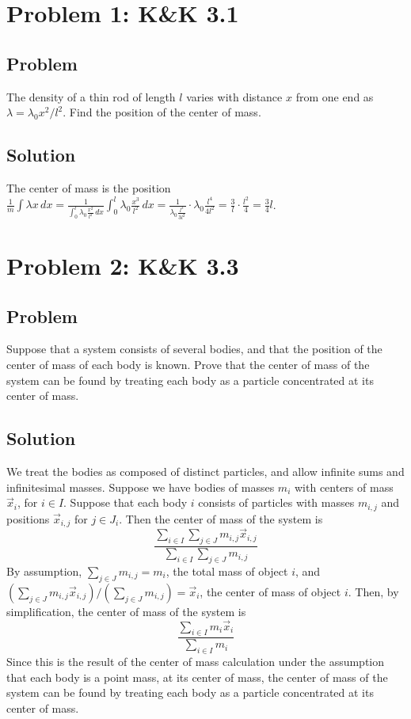 \documentclass[solutions]{esg8012pset}
\date{October 1}
\renewcommand{\d}{\,d}
\begin{document}
\section*{Problem 1: K\&K 3.1}
\subsection*{Problem}
  The density of a thin rod of length $l$ varies with distance $x$ from one end as $\lambda = \lambda_0 x^2 / l^2$.  Find the position of the center of mass.
\subsection*{Solution}
  The center of mass is the position $\displaystyle \frac{1}{m} \int \lambda x\d{x} = \frac{1}{\int_{0}^l \lambda_0 \frac{x^2}{l^2}\d{x}} \int_0^l \lambda_0 \frac{x^3}{l^2}\d{x} = \frac{1}{\lambda_0\frac{l^3}{3l^2}}\cdot\lambda_0\frac{l^4}{4l^2} = \frac{3}{l}\cdot \frac{l^2}{4} = \frac{3}{4}l$.
\section*{Problem 2: K\&K 3.3}
\subsection*{Problem}
  Suppose that a system consists of several bodies, and that the position of the center of mass of each body is known. Prove that the center of mass of the system can be found by treating each body as a particle concentrated at its center of mass.
\subsection*{Solution}
  We treat the bodies as composed of distinct particles, and allow infinite sums and infinitesimal masses.  Suppose we have bodies of masses $m_i$ with centers of mass $\vec x_i$, for $i\in I$.  Suppose that each body $i$ consists of particles with masses $m_{i, j}$ and positions $\vec x_{i, j}$ for $j\in J_i$.  Then the center of mass of the system is
  $$\frac{\displaystyle \sum_{i\in I} \sum_{j\in J} m_{i, j}\vec x_{i, j}}{\displaystyle \sum_{i\in I} \sum_{j\in J} m_{i, j}}$$
  By assumption, $\sum_{j\in J} m_{i, j} = m_i$, the total mass of object $i$, and $\left(\sum_{j\in J} m_{i, j}\vec x_{i, j}\right) / \left(\sum_{j\in J} m_{i, j}\right) = \vec x_i$, the center of mass of object $i$.  Then, by simplification, the center of mass of the system is
  $$\frac{\displaystyle \sum_{i\in I} m_i \vec x_i}{\displaystyle \sum_{i\in I} m_i}$$
  Since this is the result of the center of mass calculation under the assumption that each body is a point mass, at its center of mass, the center of mass of the system can be found by treating each body as a particle concentrated at its center of mass.
\end{document}

